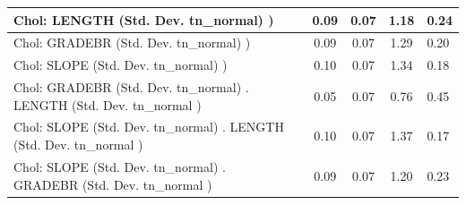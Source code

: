 \begin{table}
\begin{center}
\begin{tabular}{|l|l|c|c|c|l|}
			\hline
			 Chol: LENGTH (Std. Dev. tn_normal) ) &  & 0.09 & 0.07 & 1.18 & 0.24 \\
			\hline
			 Chol: GRADEBR (Std. Dev. tn_normal) ) &  & 0.09 & 0.07 & 1.29 & 0.20 \\
			\hline
			 Chol: SLOPE (Std. Dev. tn_normal) ) &  & 0.10 & 0.07 & 1.34 & 0.18 \\
			\hline
			 Chol: GRADEBR (Std. Dev. tn_normal) . LENGTH (Std. Dev.   tn_normal ) &  & 0.05 & 0.07 & 0.76 & 0.45 \\
			\hline
			 Chol: SLOPE (Std. Dev. tn_normal) . LENGTH (Std. Dev.   tn_normal ) &  & 0.10 & 0.07 & 1.37 & 0.17 \\
			\hline
			 Chol: SLOPE (Std. Dev. tn_normal) . GRADEBR (Std. Dev.   tn_normal ) &  & 0.09 & 0.07 & 1.20 & 0.23 \\
			\hline
		\end{tabular}
	\end{center}
\end{table}